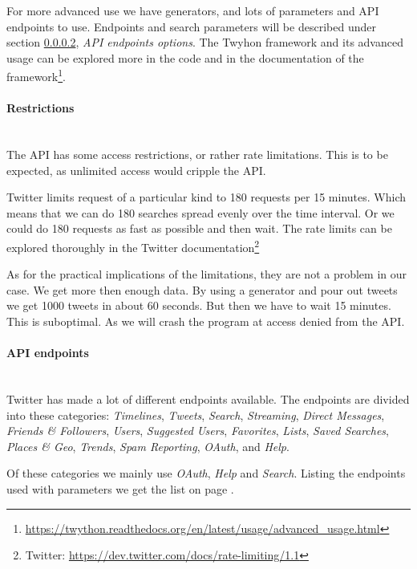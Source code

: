 For more advanced use we have generators, and lots of parameters and API
endpoints to use. Endpoints and search parameters will be described under
section \ref{data:twitter:endpoints}, \textit{API endpoints options}. 
The Twyhon framework and its advanced usage can be explored more in the code and
in the documentation of the framework\footnote{\url{https://twython.readthedocs.org/en/latest/usage/advanced_usage.html}}.
%

\paragraph{Restrictions}
\hspace{0pt}\\
The API has some access restrictions, or rather rate limitations. This is to be
expected, as unlimited access would cripple the API.

Twitter limits request of a particular kind to 180 requests per 15 minutes.
Which means that we can do 180 searches spread evenly over the time interval. Or
we could do 180 requests as fast as possible and then wait. The rate limits can
be explored thoroughly in the Twitter documentation\footnote{Twitter:
\url{https://dev.twitter.com/docs/rate-limiting/1.1}}

As for the practical implications  of the limitations, they are not a problem in
our case. We get more then enough data. By using a generator and pour out tweets
we get 1000 tweets in about 60 seconds. But then we have to wait 15 minutes.
This is suboptimal. As we will crash the program at access denied from the API.  
%

\paragraph{API endpoints}\label{data:twitter:endpoints}
\hspace{0pt}\\
Twitter has made a lot of different endpoints available. The endpoints are
divided into these categories: \textit{Timelines}, \textit{Tweets},
\textit{Search}, \textit{Streaming}, \textit{Direct Messages}, \textit{Friends
\& Followers}, \textit{Users}, \textit{Suggested Users}, \textit{Favorites},
\textit{Lists}, \textit{Saved Searches}, \textit{Places \& Geo},
\textit{Trends}, \textit{Spam Reporting}, \textit{OAuth}, and \textit{Help}.

Of these categories we mainly use \textit{OAuth}, \textit{Help} and
\textit{Search}.
Listing the endpoints used with parameters we get the list on page
\pageref{tbl:twitterAPIendpoints}. 

